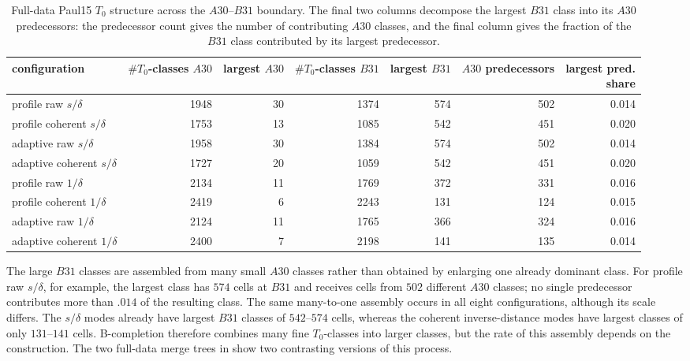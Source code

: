 \documentclass[a4paper,11pt]{article}
\theoremstyle{definition}
\theoremstyle{remark}
\begin{document}
\begin{table}[!ht]
\centering
\footnotesize
\caption{Full-data Paul15 $T_0$ structure across the $A30$--$B31$ boundary. The final two columns decompose the largest $B31$ class into its $A30$ predecessors: the predecessor count gives the number of contributing $A30$ classes, and the final column gives the fraction of the $B31$ class contributed by its largest predecessor.}
\label{tab:paul15-b31}
\setlength{\tabcolsep}{2.8pt}
\begin{tabular}{@{}lrrrrrr@{}}
\toprule
configuration & \shortstack{$\#T_0$-classes\\$A30$} & \shortstack{largest\\$A30$} & \shortstack{$\#T_0$-classes\\$B31$} & \shortstack{largest\\$B31$} & \shortstack{$A30$\\predecessors} & \shortstack{largest pred.\\share} \\
\midrule
profile raw $s/\delta$ & 1948 & 30 & 1374 & 574 & 502 & 0.014 \\
profile coherent $s/\delta$ & 1753 & 13 & 1085 & 542 & 451 & 0.020 \\
adaptive raw $s/\delta$ & 1958 & 30 & 1384 & 574 & 502 & 0.014 \\
adaptive coherent $s/\delta$ & 1727 & 20 & 1059 & 542 & 451 & 0.020 \\
profile raw $1/\delta$ & 2134 & 11 & 1769 & 372 & 331 & 0.016 \\
profile coherent $1/\delta$ & 2419 & 6 & 2243 & 131 & 124 & 0.015 \\
adaptive raw $1/\delta$ & 2124 & 11 & 1765 & 366 & 324 & 0.016 \\
adaptive coherent $1/\delta$ & 2400 & 7 & 2198 & 141 & 135 & 0.014 \\
\bottomrule
\end{tabular}
\end{table}

The large $B31$ classes are assembled from many small $A30$ classes rather than obtained by enlarging one already dominant class. For profile raw $s/\delta$, for example, the largest class has $574$ cells at $B31$ and receives cells from $502$ different $A30$ classes; no single predecessor contributes more than $.014$ of the resulting class. The same many-to-one assembly occurs in all eight configurations, although its scale differs. The $s/\delta$ modes already have largest $B31$ classes of $542$–$574$ cells, whereas the coherent inverse-distance modes have largest classes of only $131$–$141$ cells. B-completion therefore combines many fine $T_0$-classes into larger classes, but the rate of this assembly depends on the construction. The two full-data merge trees in  show two contrasting versions of this process.
\end{document}
